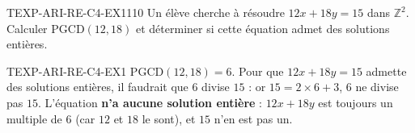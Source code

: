 

\begin{exercice}{TEXP-ARI-RE-C4-EX1}{1}{10}
Un élève cherche à résoudre $12x+18y=15$ dans $\mathbb{Z}^2$. Calculer $\mathrm{PGCD}(12,18)$ et déterminer si cette équation admet des solutions entières.
\end{exercice}


\begin{corrige}{TEXP-ARI-RE-C4-EX1}
$\mathrm{PGCD}(12,18)=6$. Pour que $12x+18y=15$ admette des solutions entières, il faudrait que $6$ divise $15$ : or $15=2\times6+3$, $6$ ne divise pas $15$. L'équation \textbf{n'a aucune solution entière} : $12x+18y$ est toujours un multiple de $6$ (car $12$ et $18$ le sont), et $15$ n'en est pas un.
\end{corrige}
